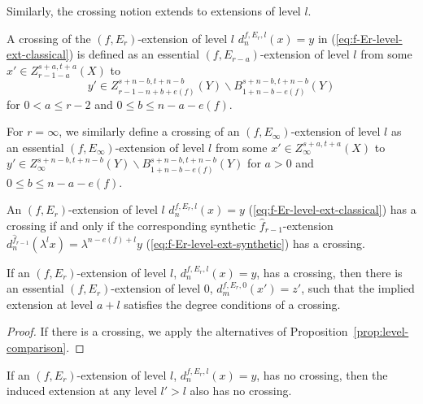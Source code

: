 Similarly, the crossing notion extends to extensions of level $l$.

\begin{definition}\label{def:f-Er-level-crossing}
    A crossing of the $(f,E_r)$-extension of level $l$ $d_{n}^{f,E_r,l}(x)=y$ in (\ref{eq:f-Er-level-ext-classical}) is defined as an essential $(f, E_{r-a})$-extension of level $l$ from some $x'\in Z_{r-1-a}^{s+a,t+a}(X)$ to
    $$y'\in Z_{r-1-n+b+e(f)}^{s+n-b,t+n-b}(Y)\backslash B_{1+n-b-e(f)}^{s+n-b,t+n-b}(Y)$$
    for $0<a \le r-2$ and $0\le b\le n-a-e(f)$.

    For $r=\infty$, we similarly define a crossing of an $(f,E_\infty)$-extension of level $l$ as an essential $(f, E_\infty)$-extension of level $l$ from some $x'\in Z_{\infty}^{s+a,t+a}(X)$ to $y'\in Z_{\infty}^{s+n-b,t+n-b}(Y)\backslash B_{1+n-b-e(f)}^{s+n-b,t+n-b}(Y)$ for $a>0$ and $0\le b\le n-a-e(f)$.
\end{definition}

\begin{proposition}\label{prop:cross-f-Er-level}
    An $(f,E_r)$-extension of level $l$ $d_{n}^{f,E_r,l}(x)=y$ (\ref{eq:f-Er-level-ext-classical}) has a crossing if and only if the corresponding synthetic $\hat f_{r-1}$-extension $d_{n}^{\hat f_{r-1}}(\lambda^l x)=\lambda^{n-e(f)+l} y$ (\ref{eq:f-Er-level-ext-synthetic}) has a crossing.
\end{proposition}

\begin{proposition}\label{prop:level-crossing-from-zero}
    If an $(f,E_r)$-extension of level $l$, $d_n^{f,E_r,l}(x)=y$, has a crossing, then there is an essential $(f,E_r)$-extension of level $0$, $d_m^{f,E_r,0}(x')=z'$, such that the implied extension at level $a+l$ satisfies the degree conditions of a crossing.
\end{proposition}
\begin{proof}
    If there is a crossing, we apply the alternatives of Proposition~\ref{prop:level-comparison}.
\end{proof}

\begin{proposition}\label{prop:level-no-crossing-stable}
    If an $(f,E_r)$-extension of level $l$, $d_n^{f,E_r,l}(x)=y$, has no crossing, then the induced extension at any level $l' > l$ also has no crossing.
\end{proposition}

